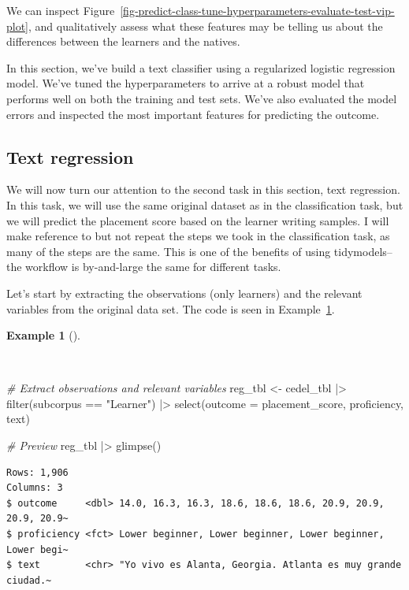 \documentclass[
  letterpaper,
]{book}
\newenvironment{Shaded}{\begin{snugshade}}{\end{snugshade}}
\newcommand{\AttributeTok}[1]{\textcolor[rgb]{0.00,0.00,0.00}{#1}}
\newcommand{\CommentTok}[1]{\textcolor[rgb]{0.00,0.00,0.00}{\textit{#1}}}
\newcommand{\FunctionTok}[1]{\textcolor[rgb]{0.00,0.00,0.00}{#1}}
\newcommand{\NormalTok}[1]{\textcolor[rgb]{0.00,0.00,0.00}{#1}}
\newcommand{\OtherTok}[1]{\textcolor[rgb]{0.00,0.00,0.00}{#1}}
\newcommand{\SpecialCharTok}[1]{\textcolor[rgb]{0.00,0.00,0.00}{#1}}
\newcommand{\StringTok}[1]{\textcolor[rgb]{0.00,0.00,0.00}{#1}}
\theoremstyle{definition}
\newtheorem{example}{Example}[chapter]
\theoremstyle{remark}
\begin{document}
We can inspect
Figure~\ref{fig-predict-class-tune-hyperparameters-evaluate-test-vip-plot},
and qualitatively assess what these features may be telling us about the
differences between the learners and the natives.

In this section, we've build a text classifier using a regularized
logistic regression model. We've tuned the hyperparameters to arrive at
a robust model that performs well on both the training and test sets.
We've also evaluated the model errors and inspected the most important
features for predicting the outcome.

\subsection{Text regression}\label{sec-predict-text-regression}

We will now turn our attention to the second task in this section, text
regression. In this task, we will use the same original dataset as in
the classification task, but we will predict the placement score based
on the learner writing samples. I will make reference to but not repeat
the steps we took in the classification task, as many of the steps are
the same. This is one of the benefits of using tidymodels--the workflow
is by-and-large the same for different tasks.

Let's start by extracting the observations (only learners) and the
relevant variables from the original data set. The code is seen in
Example~\ref{exm-predict-reg-data}.

\begin{example}[]\protect\hypertarget{exm-predict-reg-data}{}\label{exm-predict-reg-data}

~

\begin{Shaded}
\begin{Highlighting}[]
\CommentTok{\# Extract observations and relevant variables}
\NormalTok{reg\_tbl }\OtherTok{\textless{}{-}}
\NormalTok{  cedel\_tbl }\SpecialCharTok{|\textgreater{}}
  \FunctionTok{filter}\NormalTok{(subcorpus }\SpecialCharTok{==} \StringTok{"Learner"}\NormalTok{) }\SpecialCharTok{|\textgreater{}}
  \FunctionTok{select}\NormalTok{(}\AttributeTok{outcome =}\NormalTok{ placement\_score, proficiency, text)}

\CommentTok{\# Preview}
\NormalTok{reg\_tbl }\SpecialCharTok{|\textgreater{}} \FunctionTok{glimpse}\NormalTok{()}
\end{Highlighting}
\end{Shaded}

\begin{verbatim}
Rows: 1,906
Columns: 3
$ outcome     <dbl> 14.0, 16.3, 16.3, 18.6, 18.6, 18.6, 20.9, 20.9, 20.9, 20.9~
$ proficiency <fct> Lower beginner, Lower beginner, Lower beginner, Lower begi~
$ text        <chr> "Yo vivo es Alanta, Georgia. Atlanta es muy grande ciudad.~
\end{verbatim}

\end{example}
\end{document}
